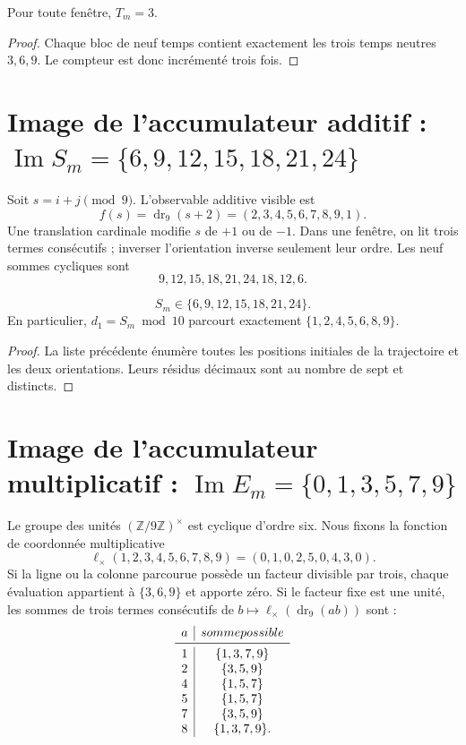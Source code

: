 \begin{lemma}
Pour toute fenêtre, \(T_m=3\).
\end{lemma}
\begin{proof}
Chaque bloc de neuf temps contient exactement les trois temps neutres
\(3,6,9\). Le compteur est donc incrémenté trois fois.
\end{proof}

\section{Image de l'accumulateur additif : \(\operatorname{Im}S_m=\{6,9,12,15,18,21,24\}\)}

Soit \(s=i+j\pmod9\). L'observable additive visible est
\[
f(s)=\operatorname{dr}_9(s+2)=(2,3,4,5,6,7,8,9,1).
\]
Une translation cardinale modifie \(s\) de \(+1\) ou de \(-1\). Dans une fenêtre, on
lit trois termes consécutifs ; inverser l'orientation inverse seulement leur
ordre. Les neuf sommes cycliques sont
\[
9,12,15,18,21,24,18,12,6.
\]

\begin{lemma}
\[
S_m\in\{6,9,12,15,18,21,24\}.
\]
En particulier, \(d_1=S_m\bmod10\) parcourt exactement
\(\{1,2,4,5,6,8,9\}\).
\end{lemma}
\nopagebreak[4]
\begin{proof}
La liste précédente énumère toutes les positions initiales de la trajectoire et les
deux orientations. Leurs résidus décimaux sont au nombre de sept et distincts.\qedhere
\end{proof}

\section{Image de l'accumulateur multiplicatif : \(\operatorname{Im}E_m=\{0,1,3,5,7,9\}\)}

Le groupe des unités \((\mathbb Z/9\mathbb Z)^\times\) est cyclique d'ordre
six. Nous fixons la fonction de coordonnée multiplicative
\[
\ell_\times(1,2,3,4,5,6,7,8,9)=(0,1,0,2,5,0,4,3,0).
\]
Si la ligne ou la colonne parcourue possède un facteur divisible par trois, chaque
évaluation appartient à \(\{3,6,9\}\) et apporte zéro. Si le facteur fixe est une
unité, les sommes de trois termes consécutifs de
\(b\mapsto\ell_\times(\operatorname{dr}_9(ab))\) sont :
\[
\begin{array}{c|c}
a&\text{somme possible}\\
\midrule
1&\{1,3,7,9\}\\
2&\{3,5,9\}\\
4&\{1,5,7\}\\
5&\{1,5,7\}\\
7&\{3,5,9\}\\
8&\{1,3,7,9\}.
\end{array}
\]

